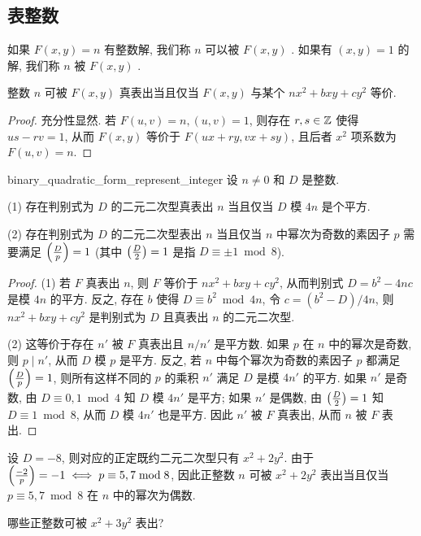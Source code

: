 \subsection{表整数}

\begin{definition}{}{}
如果 $F(x,y)=n$ 有整数解, 我们称 $n$ 可以被 $F(x,y)$ . 如果有 $(x,y)=1$ 的解, 我们称 $n$ 被 $F(x,y)$ .
\end{definition}
\begin{lemma}
整数 $n$ 可被 $F(x,y)$ 真表出当且仅当 $F(x,y)$ 与某个 $nx^2+bxy+cy^2$ 等价.
\end{lemma}
\begin{proof}
充分性显然. 若 $F(u,v)=n,(u,v)=1$, 则存在 $r,s\in{\mathbb{Z}}$ 使得 $us-rv=1$, 从而 $F(x,y)$ 等价于 $F(ux+ry,vx+sy)$, 且后者 $x^2$ 项系数为 $F(u,v)=n$.
\end{proof}

\begin{proposition}{}{binary_quadratic_form_represent_integer}
设 $n\neq 0$ 和 $D$ 是整数. 

(1) 存在判别式为 $D$ 的二元二次型真表出 $n$ 当且仅当 $D$ 模 $4n$ 是个平方.

(2) 存在判别式为 $D$ 的二元二次型表出 $n$ 当且仅当 $n$ 中幂次为奇数的素因子 $p$ 需要满足 $\left(\frac{{D}}{p}\right)=1$ (其中 $\left(\frac{{D}}{2}\right)=1$ 是指 $D\equiv \pm 1\bmod 8$).
\end{proposition}
\begin{proof}
(1) 若 $F$ 真表出 $n$, 则 $F$ 等价于 $nx^2+bxy+cy^2$, 从而判别式 $D=b^2-4nc$ 是模 $4n$ 的平方. 反之, 存在 $b$ 使得 $D\equiv b^2\bmod{4n}$, 令 $c=(b^2-D)/4n$, 则 $nx^2+bxy+cy^2$ 是判别式为 $D$ 且真表出 $n$ 的二元二次型.

(2) 这等价于存在 $n'$ 被 $F$ 真表出且 $n/n'$ 是平方数. 如果 $p$ 在 $n$ 中的幂次是奇数, 则 $p\mid n'$, 从而 $D$ 模 $p$ 是平方. 反之, 若 $n$ 中每个幂次为奇数的素因子 $p$ 都满足 $\left(\frac{{D}}{p}\right)=1$, 则所有这样不同的 $p$ 的乘积 $n'$ 满足 $D$ 是模 $4n'$ 的平方. 如果 $n'$ 是奇数, 由 $D\equiv0,1\bmod4$ 知 $D$ 模 $4n'$ 是平方; 如果 $n'$ 是偶数, 由 $\left(\frac{{D}}{2}\right)=1$ 知 $D\equiv 1\bmod 8$, 从而 $D$ 模 $4n'$ 也是平方. 因此 $n'$ 被 $F$ 真表出, 从而 $n$ 被 $F$ 表出.
\end{proof}

\begin{example}
设 $D=-8$, 则对应的正定既约二元二次型只有 $x^2+2y^2$. 由于 $\left(\frac{{-2}}{p}\right)=-1\iff p\equiv 5,7\bmod8$, 因此正整数 $n$ 可被 $x^2+2y^2$ 表出当且仅当 $p\equiv 5,7\bmod 8$ 在 $n$ 中的幂次为偶数.
\end{example}
\begin{exercise}
哪些正整数可被 $x^2+3y^2$ 表出?
\end{exercise}

